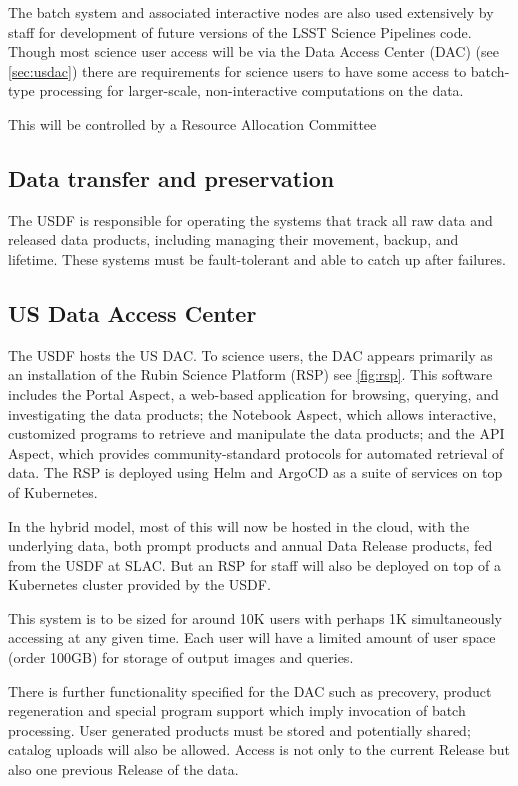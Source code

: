 The batch system and associated interactive nodes are also used extensively by staff for development of future versions of the LSST Science Pipelines code.\cite{2019ASPC..523..521B}
Though most science user access will be via the Data Access Center (DAC) (see \autoref{sec:usdac})
there are requirements for science users to have some access to batch-type processing for larger-scale, non-interactive computations on the data.\cite{DMTN-223}

This will be controlled by a Resource Allocation Committee

\subsection{Data transfer and preservation} \label{req:dbb}
The USDF is responsible for operating the systems that track all raw data and released data products, including managing their movement, backup, and lifetime.
These systems must be fault-tolerant and able to catch up after failures.

\subsection{US Data Access Center}\label{sec:usdac}
The USDF hosts the US DAC.
To science users, the DAC appears primarily as an installation of the Rubin Science Platform (RSP)\cite{LDM-542} see \autoref{fig:rsp}.
This software includes the Portal Aspect, a web-based application for browsing, querying, and investigating the data products; the Notebook Aspect, which allows interactive, customized programs to retrieve and manipulate the data products; and the API Aspect, which provides community-standard protocols for automated retrieval of data.
The RSP is deployed using Helm and ArgoCD as a suite of services on top of Kubernetes.

In the hybrid model, most of this will now be hosted in the cloud, with the underlying data, both prompt products and annual Data Release products, fed from the USDF at SLAC.
But an RSP for staff will also be deployed on top of a Kubernetes cluster provided by the USDF.

This system is to be sized for around 10K users with perhaps 1K simultaneously accessing at any given time.
Each user will have a limited amount of user space (order 100GB) for storage of output images and queries.

There is further functionality specified for the DAC such as precovery, product regeneration and special program support which imply invocation
of batch processing.
User generated products must be stored and potentially shared; catalog uploads will also be allowed.
Access is not only to the current Release but also one previous Release of the data.
